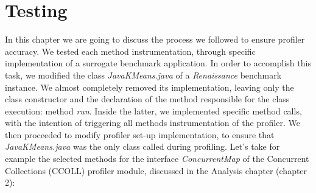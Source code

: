 \documentclass[]{usiinfthesis}
\begin{document}
\section{Testing}
In this chapter we are going to discuss the process we followed to ensure profiler accuracy. We tested each method instrumentation, through specific implementation of a surrogate benchmark application. In order to accomplish this task, we modified the class \textit{JavaKMeans.java} of a \textit{Renaissance} benchmark instance. We almost completely removed its implementation, leaving only the class constructor and the declaration of the method responsible for the class execution: method \textit{run}. Inside the latter, we implemented specific method calls, with the intention of triggering all methods instrumentation of the profiler. We then proceeded to modify profiler set-up implementation, to ensure that \textit{JavaKMeans.java} was the only class called during profiling.
\newline \newline
Let's take for example the selected methods for the interface \textit{ConcurrentMap} of the Concurrent Collections (CCOLL) profiler module, discussed in the Analysis chapter (chapter 2):
\end{document}
